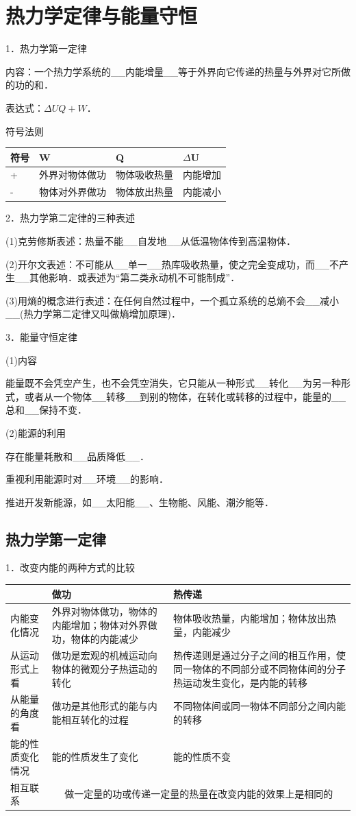\section{热力学定律与能量守恒}


1．热力学第一定律

内容：一个热力学系统的\_\_内能增量\_\_等于外界向它传递的热量与外界对它所做的功的和．

表达式：$\Delta UQ+W$．

符号法则

\begin{longtable}[]{@{}llll@{}}
\toprule
符号 & W & Q & $\Delta$U\tabularnewline
\midrule
\endhead
+ & 外界对物体做功 & 物体吸收热量 &
内能增加\tabularnewline
- & 物体对外界做功 & 物体放出热量 &
内能减小\tabularnewline
\bottomrule
\end{longtable}

2．热力学第二定律的三种表述

(1)克劳修斯表述：热量不能\_\_自发地\_\_从低温物体传到高温物体．

(2)开尔文表述：不可能从\_\_单一\_\_热库吸收热量，使之完全变成功，而\_\_不产生\_\_其他影响．或表述为``第二类永动机不可能制成''．

(3)用熵的概念进行表述：在任何自然过程中，一个孤立系统的总熵不会\_\_减小\_\_(热力学第二定律又叫做熵增加原理)．

3．能量守恒定律

(1)内容

能量既不会凭空产生，也不会凭空消失，它只能从一种形式\_\_转化\_\_为另一种形式，或者从一个物体\_\_转移\_\_到别的物体，在转化或转移的过程中，能量的\_\_总和\_\_保持不变．

(2)能源的利用

存在能量耗散和\_\_品质降低\_\_．

重视利用能源时对\_\_环境\_\_的影响．

推进开发新能源，如\_\_太阳能\_\_、生物能、风能、潮汐能等．

\newpage
\subsection{热力学第一定律}

1．改变内能的两种方式的比较

\begin{longtable}[]{@{}m{1.5cm}m{5cm}m{5cm}@{}}
\toprule
&
做功
&
热传递
\tabularnewline
\midrule
\endhead
内能变化情况
&
外界对物体做功，物体的内能增加；物体对外界做功，物体的内能减少
&
物体吸收热量，内能增加；物体放出热量，内能减少
\tabularnewline
从运动形式上看 & 做功是宏观的机械运动向物体的微观分子热运动的转化 &
热传递则是通过分子之间的相互作用，使同一物体的不同部分或不同物体间的分子热运动发生变化，是内能的转移\tabularnewline
从能量的角度看 & 做功是其他形式的能与内能相互转化的过程 &
不同物体间或同一物体不同部分之间内能的转移\tabularnewline
能的性质变化情况 & 能的性质发生了变化 & 能的性质不变\tabularnewline
相互联系 & \multicolumn{2}{c}{做一定量的功或传递一定量的热量在改变内能的效果上是相同的}
\tabularnewline
\bottomrule
\end{longtable}

